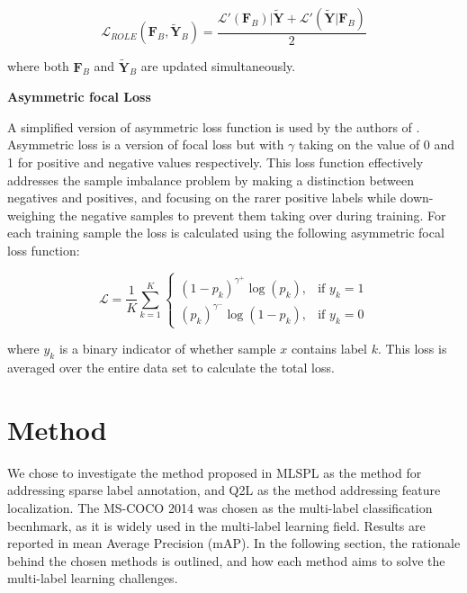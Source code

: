 \documentclass[lettersize,journal]{IEEEtran}
\renewcommand{\paragraph}[1]{%
  \vspace{1.5ex}\textbf{#1}\quad
}
\begin{document}
\begin{equation}
    \label{eq:role}
    \mathcal{L}_{ROLE}(\mathbf{F}_B, \mathbf{\tilde{Y}}_B) = \frac{\mathcal{L}'(\mathbf{F}_B)|\mathbf{\tilde{Y}}+\mathcal{L}'(\mathbf{\tilde{Y}}|\mathbf{F}_B)}{2}
\end{equation}

\noindent where both $\mathbf{F}_B$ and $\tilde{\mathbf{Y}}_B$ are updated simultaneously.

\paragraph{Asymmetric focal Loss}
\label{sec:afl}
A simplified version of asymmetric loss function is used by the authors of \cite{Query2Label}. Asymmetric loss is a version of focal loss but with $\gamma$ taking on the value of 0 and 1 for positive and negative values respectively. This loss function effectively addresses the sample imbalance problem by making a distinction between negatives and positives, and focusing on the rarer positive labels while down-weighing the negative samples to prevent them taking over during training. For each training sample the loss is calculated using the following asymmetric focal loss function:

\begin{equation}
    \mathcal{L} = \frac{1}{K} \sum_{k=1}^{K}
\begin{cases}
(1 - p_k)^{\gamma^+} \log(p_k), & \text{if } y_k = 1 \\
(p_k)^{\gamma^-} \log(1 - p_k), & \text{if } y_k = 0
\end{cases}
\end{equation}

\noindent where $y_k$ is a binary indicator of whether sample $x$ contains label $k$. This loss is averaged over the entire data set to calculate the total loss. 


\section{Method}
We chose to investigate the method proposed in MLSPL as the method for addressing sparse label annotation, and Q2L as the method addressing feature localization. The MS-COCO 2014 was chosen as the multi-label classification becnhmark, as it is widely used in the multi-label learning field. Results are reported in mean Average Precision (mAP). In the following section, the rationale behind the chosen methods is outlined, and how each method aims to solve the multi-label learning challenges.
\end{document}
